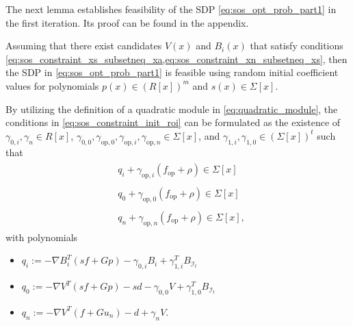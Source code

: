The next lemma establishes feasibility of the SDP \cref{eq:sos_opt_prob_part1} in the first iteration.
Its proof can be found in the appendix.
\begin{lemma} \label{lem:feasible_solution}
   Assuming that there exist candidates $V(x)$ and $B_i(x)$ that satisfy conditions \cref{eq:sos_constraint_xs_subsetneq_xa,eq:sos_constraint_xn_subsetneq_xs}, then the SDP in \cref{eq:sos_opt_prob_part1} is feasible using random initial coefficient values for polynomials $p(x) \in (R[x])^m$ and $s(x) \in \Sigma[x]$.
\end{lemma}
\begin{IEEEproof}
   By utilizing the definition of a quadratic module in \cref{eq:quadratic_module}, the conditions in \cref{eq:sos_constraint_init_roi} can be formulated as the existence of $\gamma_{0,i}, \gamma_n \in R[x]$, $\gamma_{0,0}, \gamma_{\text{op}, 0}, \gamma_{\text{op},i}, \gamma_{\text{op},n} \in \Sigma[x]$, and $\gamma_{1,i}, \gamma_{1,0} \in (\Sigma[x])^t$ such that
   \begin{subequations} \label{eq:sos_constraint_lemma_4}
      \begin{align}
         \begin{split}
            & q_i + \gamma_{\text{op}, i} (f_\text{op} + \rho) \in \Sigma[x]   
         \end{split} \\
         \begin{split}
            & q_0 + \gamma_{\text{op}, 0} (f_\text{op} + \rho) \in \Sigma[x]
         \end{split} \\
         \begin{split}
            & q_n + \gamma_{\text{op}, n} (f_\text{op} + \rho) \in \Sigma[x],
         \end{split}
      \end{align}
   \end{subequations}
   with polynomials \begin{itemize}
      \item $q_i := -\nabla B_i^T \left ( s f + G p \right ) - \gamma_{0,i} B_i + \gamma_{1,i}^T B_{\mathcal I_t}$
      \item $q_0 := -\nabla V^T \left ( s f + G p \right ) - s d - \gamma_{0,0} V + \gamma_{1,0}^T B_{\mathcal I_t}$
      \item $q_n := -\nabla V^T \left ( f + G u_n \right ) - d + \gamma_n V$.
   \end{itemize}
   

\end{IEEEproof}
